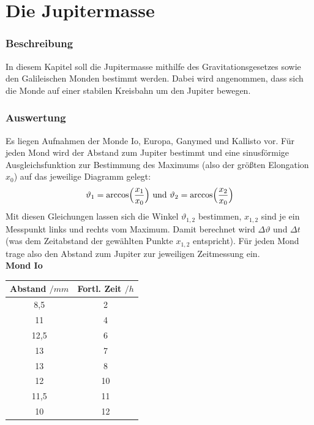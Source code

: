 \documentclass[12pt]{article}
\begin{document}
\section{Die Jupitermasse}
\subsubsection*{Beschreibung}
In diesem Kapitel soll die Jupitermasse mithilfe des Gravitationsgesetzes sowie den Galileischen Monden bestimmt werden. Dabei wird angenommen, dass sich die Monde auf einer stabilen Kreisbahn um den Jupiter bewegen.
\subsubsection*{Auswertung}
Es liegen Aufnahmen  der Monde Io, Europa, Ganymed und Kallisto vor. Für jeden Mond wird der Abstand zum Jupiter bestimmt und eine sinusförmige Ausgleichsfunktion zur Bestimmung des Maximums (also der größten Elongation $x_0$) auf das jeweilige Diagramm gelegt:
\[\vartheta_1 = \arccos \Bigl(\frac{x_1}{x_0}\Bigr) \ \textnormal{und} \ \vartheta_2 = \arccos \Bigl(\frac{x_2}{x_0}\Bigr)\]
Mit diesen Gleichungen lassen sich die Winkel $\vartheta_{1,2}$ bestimmen, $x_{1,2}$ sind je ein Messpunkt links und rechts vom Maximum. Damit berechnet wird $\Delta \vartheta$ und $\Delta t$ (was dem Zeitabstand der gewählten Punkte $x_{1,2}$ entspricht). Für jeden Mond trage also den Abstand zum Jupiter zur jeweiligen Zeitmessung ein.\\
\newpage\noindent
\textbf{Mond Io}\\
\begin{minipage}{.4\linewidth}
    \vspace*{-1cm}\begin{tabular}{c|c}
            Abstand $/ mm$ & Fortl. Zeit $/h$ \\ \hline
            8,5 & 2 \\ 
            11 & 4 \\ 
            12,5 & 6 \\ 
            13 & 7 \\ 
            13 & 8 \\ 
            12 & 10 \\ 
            11,5 & 11 \\ 
            10 & 12 \\ 
    \end{tabular}
\end{minipage}
\begin{minipage}{.5\linewidth}
    \centering
{}
\end{minipage}\\
\end{document}

